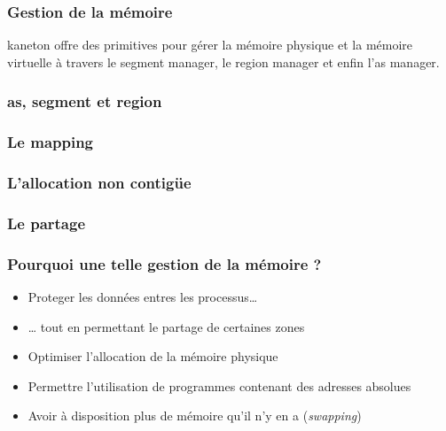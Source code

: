 
\begin{frame}
  \frametitle{Gestion de la m\'{e}moire}

  kaneton offre des primitives pour g\'{e}rer la m\'{e}moire physique et la
  m\'{e}moire virtuelle \`{a} travers le segment manager, le region manager et
  enfin l'as manager.

\end{frame}


\begin{frame}
  \frametitle{as, segment et region}

  \begin{center}
  \end{center}
\end{frame}


\begin{frame}
  \frametitle{Le mapping}

  \begin{center}
  \end{center}
\end{frame}


\begin{frame}
  \frametitle{L'allocation non contig\"{u}e}

  \begin{center}
  \end{center}
\end{frame}


\begin{frame}
  \frametitle{Le partage}

  \begin{center}
  \end{center}
\end{frame}


\begin{frame}
  \frametitle{Pourquoi une telle gestion de la m\'{e}moire ?}

  \begin{itemize}
  \item
    Proteger les donn\'{e}es entres les processus\ldots
  \item
    \ldots{} tout en permettant le partage de certaines zones
  \item
    Optimiser l'allocation de la m\'{e}moire physique
  \item
    Permettre l'utilisation de programmes contenant des adresses absolues
  \item
    Avoir \`{a} disposition plus de m\'{e}moire qu'il n'y en a (\emph{swapping})
  \end{itemize}

\end{frame}

